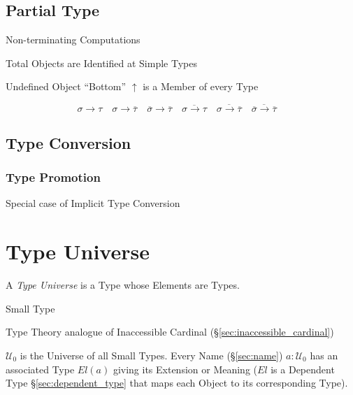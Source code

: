 \subsection{Partial Type}\label{sec:partial_type}
\cite{thompson99}

Non-terminating Computations

Total Objects are Identified at Simple Types

Undefined Object ``Bottom'' $\uparrow$ is a Member of every Type

\[
  \sigma \rightarrow \tau \quad
  \sigma \rightarrow \overline{\tau} \quad
  \overline{\sigma} \rightarrow \overline{\tau} \quad
  \overline{\sigma \rightarrow \tau} \quad
  \overline{\sigma \rightarrow \overline{\tau}} \quad
  \overline{\overline{\sigma} \rightarrow \overline{\tau}} \quad
\]



\subsection{Type Conversion}\label{sec:type_conversion}

\subsubsection{Type Promotion}\label{sec:type_promotion}

Special case of Implicit Type Conversion



\section{Type Universe}\label{sec:type_universe}

A \emph{Type Universe} is a Type whose Elements are Types.

Small Type %

Type Theory analogue of Inaccessible Cardinal
(\S\ref{sec:inaccessible_cardinal})

$\mathcal{U}_0$ is the Universe of all Small Types. Every Name
(\S\ref{sec:name}) $a:\mathcal{U}_0$ has an associated Type $El(a)$
giving its Extension or Meaning ($El$ is a Dependent Type
\S\ref{sec:dependent_type} that maps each Object to its corresponding
Type).

